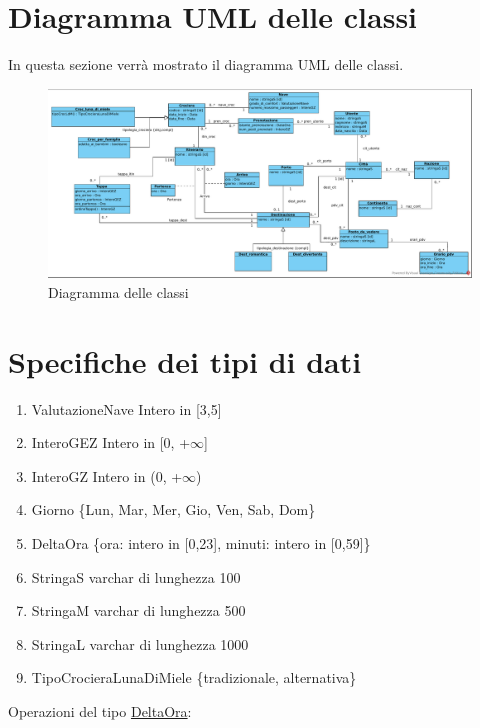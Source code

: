 \documentclass{article}
\begin{document}
\newpage
\section{Diagramma UML delle classi}

In questa sezione verrà mostrato il diagramma UML delle classi.
\begin{figure}[h]
    \centering
    \includegraphics[width=\textwidth]{../Diagramma delle classi.pdf}
    \caption{Diagramma delle classi}
\end{figure}

\newpage
\section{Specifiche dei tipi di dati}

\begin{enumerate}
    \item ValutazioneNave Intero in [3,5]\label{sec:ValutazioneNave}
    \item InteroGEZ Intero in [0, +$\infty$]\label{sec:InteroGEZ}
    \item InteroGZ Intero in (0, +$\infty$)\label{sec:InteroGZ}
    \item Giorno \{Lun, Mar, Mer, Gio, Ven, Sab, Dom\}\label{sec:Giorno}
    \item DeltaOra \{ora: intero in [0,23], minuti: intero in [0,59]\}\label{sec:DeltaOra}
    \item StringaS varchar di lunghezza 100\label{sec:StringaS}
    \item StringaM varchar di lunghezza 500\label{sec:StringaM}
    \item StringaL varchar di lunghezza 1000\label{sec:StringaL}
    \item TipoCrocieraLunaDiMiele \{tradizionale, alternativa\}\label{sec:TipoCrocieraLunaDiMiele}
\end{enumerate}

Operazioni del tipo \hyperref[sec:DeltaOra]{DeltaOra}:\label{sec:OperazioniDeltaOra}
\end{document}
